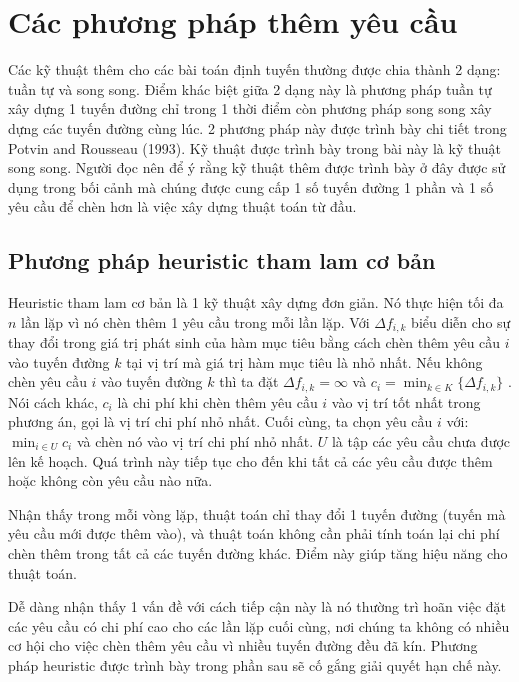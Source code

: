 \section{Các phương pháp thêm yêu cầu}
Các kỹ thuật thêm cho các bài toán định tuyến thường được chia thành 2 dạng: tuần tự và song song. Điểm khác biệt giữa 2 dạng này là phương pháp tuần tự xây dựng 1 tuyến đường chỉ trong 1 thời điểm còn phương pháp song song xây dựng các tuyến đường cùng lúc. 2 phương pháp này được trình bày chi tiết trong Potvin and Rousseau (1993). Kỹ thuật được trình bày trong bài này là kỹ thuật song song. Người đọc nên để ý rằng kỹ thuật thêm được trình bày ở đây được sử dụng trong bối cảnh mà chúng được cung cấp 1 số tuyến đường 1 phần và 1 số yêu cầu để chèn hơn là việc xây dựng thuật toán từ đầu.

\subsection{Phương pháp heuristic tham lam cơ bản}
Heuristic tham lam cơ bản là 1 kỹ thuật xây dựng đơn giản. Nó thực hiện tối đa $n$ lần lặp vì nó chèn thêm 1 yêu cầu trong mỗi lần lặp. Với $\Delta f_{i, k}$ biểu diễn cho sự thay đổi trong giá trị phát sinh của hàm mục tiêu bằng cách chèn thêm yêu cầu $i$ vào tuyến đường $k$ tại vị trí mà giá trị hàm mục tiêu là nhỏ nhất. Nếu không chèn yêu cầu $i$ vào tuyến đường $k$ thì ta đặt $\Delta f_{i, k} = \infty$ và $c_i = \min_{k \in K}\{\Delta f_{i, k}\}$ . Nói cách khác, $c_i$ là chi phí khi chèn thêm yêu cầu $i$ vào vị trí tốt nhất trong phương án, gọi là vị trí chi phí nhỏ nhất. Cuối cùng, ta chọn yêu cầu $i$ với: $\min_{i \in U} c_i$ và chèn nó vào vị trí chi phí nhỏ nhất. $U$ là tập các yêu cầu chưa được lên kế hoạch. Quá trình này tiếp tục cho đến khi tất cả các yêu cầu được thêm hoặc không còn yêu cầu nào nữa.

Nhận thấy trong mỗi vòng lặp, thuật toán chỉ thay đổi 1 tuyến đường (tuyến mà yêu cầu mới được thêm vào), và thuật toán không cần phải tính toán lại chi phí chèn thêm trong tất cả các tuyến đường khác. Điểm này giúp tăng hiệu năng cho thuật toán.

Dễ dàng nhận thấy 1 vấn đề với cách tiếp cận này là nó thường trì hoãn việc đặt các yêu cầu có chi phí cao cho các lần lặp cuối cùng, nơi chúng ta không có nhiều cơ hội cho việc chèn thêm yêu cầu vì nhiều tuyến đường đều đã kín. Phương pháp heuristic được trình bày trong phần sau sẽ cố gắng giải quyết hạn chế này.

